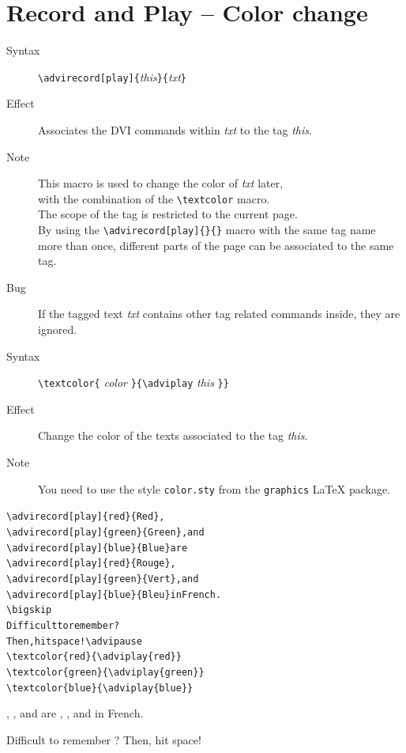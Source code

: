 \documentclass[10pt]{article}
\begin{document}
\section{Record and Play -- Color change}

\begin{description}
\item[Syntax] \verb"\advirecord[play]{"{\em{this}}\verb"}{"{\em{txt}}\verb"}"
\item[Effect] Associates the DVI commands within {\em{txt}} to
  the {\ActiveDVI} tag {\em{this}}.
\item[Note] This macro is used to change the color of {\em{txt}}
later,\\
 with the combination of the \verb"\textcolor" macro.\\
  The scope of the tag is restricted to the current page.\\
  By using the \verb"\advirecord[play]{}{}" macro with the same tag name\\
  more than once, different parts of the page can be associated to the same tag.
\item[Bug] If the tagged text {\em{txt}} contains other tag related
 commands inside, they are ignored.
\end{description}

\begin{description}
\item[Syntax] \verb"\textcolor{" {\em{color}} \verb"}{\adviplay"
                      {\em{this}} \verb"}}"
\item[Effect] Change the color of the texts associated to the tag {\em{this}}.
\item[Note] You need to use the style \verb"color.sty" from the
\verb"graphics" {\LaTeX} package.
\end{description}

\noindent
\begin{minipage}[t]{0.5\textwidth}
\begin{alltt}
{\color{blue}\verb"\advirecord[play]{red}{Red}"},
{\color{blue}\verb"\advirecord[play]{green}{Green}"}, and
{\color{blue}\verb"\advirecord[play]{blue}{Blue}"} are
{\color{blue}\verb"\advirecord[play]{red}{Rouge}"},
{\color{blue}\verb"\advirecord[play]{green}{Vert}"}, and
{\color{blue}\verb"\advirecord[play]{blue}{Bleu}"} in French.
\verb"\bigskip"
Difficult to remember ?
Then, hit space!\verb"\advipause"
{\color{blue}\verb"\textcolor{red}{\adviplay{red}}"}
{\color{blue}\verb"\textcolor{green}{\adviplay{green}}"}
{\color{blue}\verb"\textcolor{blue}{\adviplay{blue}}"}
\end{alltt}
\end{minipage}\advipause
\begin{minipage}[t]{0.5\textwidth}
,
, and
 are
,
, and
 in French.\advipause

\bigskip
Difficult to remember ?
Then, hit space!\advipause
\textcolor{red}{}
\textcolor{green}{}
\textcolor{blue}{}
\end{minipage}
\end{document}
